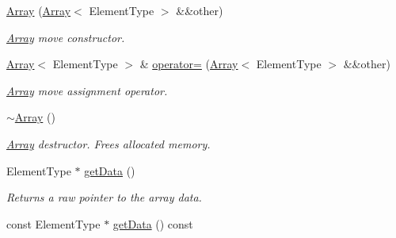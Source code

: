 \begin{DoxyCompactItemize}
\mbox{\label{class_arcana_1_1_array_ab9ddb391868e9e4b8b8dba44778ff9e0}} 
\mbox{\hyperlink{class_arcana_1_1_array_ab9ddb391868e9e4b8b8dba44778ff9e0}{Array}} (\mbox{\hyperlink{class_arcana_1_1_array}{Array}}$<$ Element\+Type $>$ \&\&other)
\begin{DoxyCompactList}\small\item\em \mbox{\hyperlink{class_arcana_1_1_array}{Array}} move constructor. \end{DoxyCompactList}\item 
\mbox{\label{class_arcana_1_1_array_adae8ba60220ecde6bf7f53d2ff80ae90}} 
\mbox{\hyperlink{class_arcana_1_1_array}{Array}}$<$ Element\+Type $>$ \& \mbox{\hyperlink{class_arcana_1_1_array_adae8ba60220ecde6bf7f53d2ff80ae90}{operator=}} (\mbox{\hyperlink{class_arcana_1_1_array}{Array}}$<$ Element\+Type $>$ \&\&other)
\begin{DoxyCompactList}\small\item\em \mbox{\hyperlink{class_arcana_1_1_array}{Array}} move assignment operator. \end{DoxyCompactList}\item 
\mbox{\label{class_arcana_1_1_array_a9cc19e98ee2fc944c0c5aab64b1ae3c6}} 
\mbox{\hyperlink{class_arcana_1_1_array_a9cc19e98ee2fc944c0c5aab64b1ae3c6}{$\sim$\+Array}} ()
\begin{DoxyCompactList}\small\item\em \mbox{\hyperlink{class_arcana_1_1_array}{Array}} destructor. Frees allocated memory. \end{DoxyCompactList}\item 
\mbox{\label{class_arcana_1_1_array_a5cdee51f03c8987970f841bbe07117d2}} 
Element\+Type $\ast$ \mbox{\hyperlink{class_arcana_1_1_array_a5cdee51f03c8987970f841bbe07117d2}{get\+Data}} ()
\begin{DoxyCompactList}\small\item\em Returns a raw pointer to the array data. \end{DoxyCompactList}\item 
\mbox{\label{class_arcana_1_1_array_a348d34e37a8257e4d9384740a174ab9e}} 
const Element\+Type $\ast$ \mbox{\hyperlink{class_arcana_1_1_array_a348d34e37a8257e4d9384740a174ab9e}{get\+Data}} () const

\end{DoxyCompactItemize}
